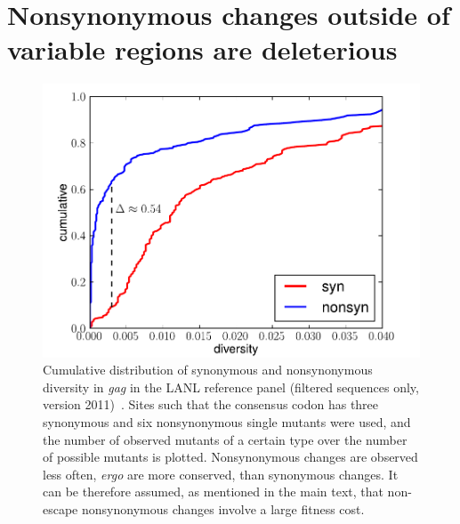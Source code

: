 \documentclass[rmp]{revtex4}
\begin{document}
\section{Nonsynonymous changes outside of variable regions are deleterious}
\begin{figure}[h]
\begin{center}
\includegraphics[width=0.4\linewidth]{synmut_conservation_4fold_synnonsyn}
\caption{Cumulative distribution of synonymous and nonsynonymous diversity in
{\it gag} in the LANL reference panel (filtered
sequences only, version 2011)~\cite{LANL2012}. Sites such that the consensus codon
has three synonymous and six nonsynonymous single mutants were used, and the number of observed mutants
of a certain type over the number of possible mutants is plotted. Nonsynonymous
changes are observed less often, {\it ergo} are more conserved, than
synonymous changes. It can be therefore assumed, as mentioned in the main text,
that non-escape nonsynonymous changes involve a large fitness cost.}
\label{fig:synnonsyncons}
\end{center}
\end{figure}

\end{document}
